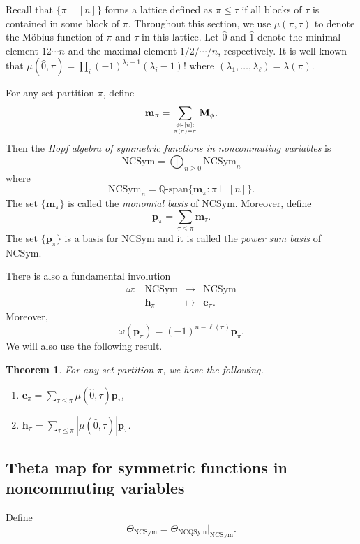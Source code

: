 \documentclass[11pt]{amsart}
\newtheorem{Theorem}{Theorem}[section]
\numberwithin{equation}{section}
\newcommand{\NSym}{\mathrm{NSym}}
\newcommand{\NCQSym}{\mathrm{NCQSym}}
\newcommand{\NCSym}{\mathrm{NCSym}}
\newcommand{\bfh}{{\mathbf{h}}}
\newcommand{\bfe}{{\mathbf{e}}}
\newcommand{\bfp}{{\mathbf{p}}}
\newcommand{\bfm}{{\mathbf{m}}}
\newcommand{\bfM}{{\mathbf{M}}}
\begin{document}
Recall that $\{\pi\vdash[n]\}$ forms a lattice defined as $\pi\leq\tau$ if all blocks of $\tau$ is contained in some block of $\pi$. 
Throughout this section, we use $\mu(\pi,\tau)$ to denote the M\"{o}bius function of $\pi$ and $\tau$ in this lattice. 
Let $\hat{0}$ and $\hat{1}$ denote the minimal element $12\cdots n$ and the maximal element $1/2/\cdots/n$, respectively. It is well-known that $\mu(\hat{0},\pi)=\prod_i(-1)^{\lambda_i-1}(\lambda_i-1)!$ where $(\lambda_1,\dots,\lambda_\ell)=\lambda(\pi)$.

For any set partition $\pi$, define 
$$\bfm_\pi=\sum_{\phi\vDash [n]: \atop \pi(\pi)=\pi} \bfM_\phi.$$
Then the \emph{Hopf algebra of symmetric functions in noncommuting variables} is 
$$\NCSym=\bigoplus_{n\geq 0} \NCSym_n$$ where 
$$\NCSym_n=\mathbb{Q}\text{-span}\{ \bfm_\pi: \pi\vdash [n]\}.$$
The set $\{\bfm_\pi\}$ is called the \emph{monomial basis} of $\NCSym$. Moreover, define 
$$\bfp_\pi=\sum_{\tau\leq \pi} \bfm_\tau.$$ The set $\{\bfp_\pi\}$ is a basis for $\NCSym$ and it is called the  \emph{power sum basis} of $\NCSym$. 



There is also a fundamental involution 
$$\begin{array}{cccc}
\omega:&\NCSym&\to&\NCSym\\
& \bfh_\pi &\mapsto & \bfe_\pi.
\end{array}$$
Moreover, 
$$\omega(\bfp_\pi)=(-1)^{n-\ell(\pi)}\bfp_\pi.$$
We will also use the following result.

\begin{Theorem}\label{thm:htop}{\cite[Theorems 3.4 and 3.5]{R04}} 
	For any set partition $\pi$, we have the following. 
	\begin{enumerate} 
		\item $\mathbf{e}_\pi=\displaystyle\sum_{\tau\leq \pi}\mu(\hat{0},\tau)\mathbf{p}_{\tau}$,
		\item  $\mathbf{h}_\pi=\displaystyle\sum_{\tau\leq \pi}|\mu(\hat{0},\tau)|\mathbf{p}_{\tau}$.
	\end{enumerate} 
\end{Theorem}


\subsection{Theta map for symmetric functions in noncommuting variables}\label{subsec:theta-ncsym}
	Define 
	$$\Theta_{\NCSym}=\Theta_{\NCQSym}|_{\NCSym}.$$ 
\end{document}
